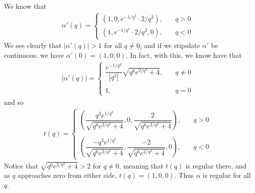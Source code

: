 \documentclass{article}
\begin{document}
	We know that
	\begin{gather*}
		\alpha'(q) = \begin{cases}
			\left( 1, 0, e^{-1/q^2} \cdot 2/q^3 \right), \quad &q > 0 \\
			\left( 1, e^{-1/q^2} \cdot 2/q^3, 0 \right), \quad &q < 0
		\end{cases}
	\end{gather*}
	We see clearly that $|\alpha'(q)| > 1$ for all $q \neq 0$, and if we stipulate $\alpha'$ be continuous, we have $\alpha'(0) = (1, 0, 0)$. In fact, with this, we know have that
	\begin{gather*}
		| \alpha'(q) | = \begin{cases}
			\dfrac{ e^{-1/q^2} }{ |q^3| } \sqrt{ q^6 e^{2/q^2} + 4 }, \quad &q \neq 0 \\ \\
			1, \quad &q = 0
		\end{cases}
	\end{gather*}
	and so
	\begin{gather*}
		t(q) = \begin{cases}
			\left( \dfrac{q^3 e^{1/q^2} }{ \sqrt{ q^6 e^{2/q^2} + 4 } }, 0, \dfrac{2}{ \sqrt{ q^6 e^{2/q^2} + 4 } } \right), \quad &q > 0
			\\ \\
			\left( \dfrac{-q^3 e^{1/q^2} }{ \sqrt{ q^6 e^{2/q^2} + 4 } }, \dfrac{-2}{ \sqrt{ q^6 e^{2/q^2} + 4 } }, 0 \right), \quad &q < 0
		\end{cases}
	\end{gather*}
	Notice that $\sqrt{ q^6 e^{2/q^2} + 4 } > 2$ for $q \neq 0$, meaning that $t(q)$ is regular there, and as $q$ approaches zero from either side, $t(q) = (1, 0, 0)$. Thus $\alpha$ is regular for all $q$.
	
\end{document}
